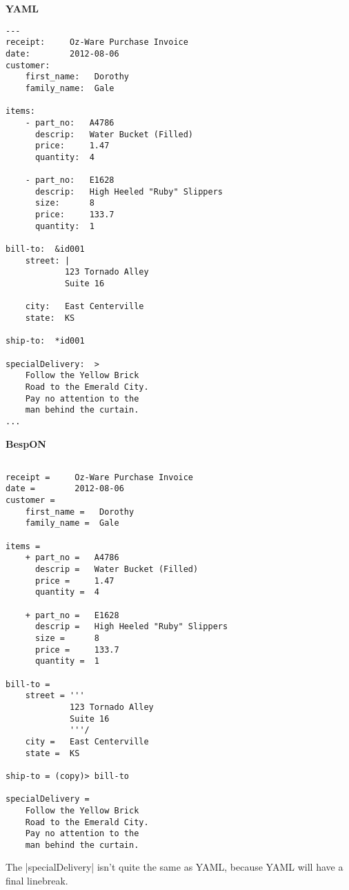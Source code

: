 \documentclass[11pt]{article}
\begin{document}
\begin{appendices}
\begin{tcolorbox}{}
\begin{multicols}{2}
\centering \textbf{YAML}
\begin{Verbatim}[formatcom=\color{DarkGreen}]
---
receipt:     Oz-Ware Purchase Invoice
date:        2012-08-06
customer:
    first_name:   Dorothy
    family_name:  Gale

items:
    - part_no:   A4786
      descrip:   Water Bucket (Filled)
      price:     1.47
      quantity:  4

    - part_no:   E1628
      descrip:   High Heeled "Ruby" Slippers
      size:      8
      price:     133.7
      quantity:  1

bill-to:  &id001
    street: |
            123 Tornado Alley
            Suite 16

    city:   East Centerville
    state:  KS

ship-to:  *id001

specialDelivery:  >
    Follow the Yellow Brick
    Road to the Emerald City.
    Pay no attention to the
    man behind the curtain.
...
\end{Verbatim}
\columnbreak
\centering \textbf{BespON}

\begin{Verbatim}

receipt =     Oz-Ware Purchase Invoice
date =        2012-08-06
customer =
    first_name =   Dorothy
    family_name =  Gale

items =
    + part_no =   A4786
      descrip =   Water Bucket (Filled)
      price =     1.47
      quantity =  4

    + part_no =   E1628
      descrip =   High Heeled "Ruby" Slippers
      size =      8
      price =     133.7
      quantity =  1

bill-to =
    street = '''
             123 Tornado Alley
             Suite 16
             '''/
    city =   East Centerville
    state =  KS

ship-to = (copy)> bill-to

specialDelivery = 
    Follow the Yellow Brick
    Road to the Emerald City.
    Pay no attention to the
    man behind the curtain.

\end{Verbatim}
\end{multicols}
\end{tcolorbox}
The |specialDelivery| isn't quite the same as YAML, because YAML will have a final linebreak.



\begin{tcolorbox}{}
\begin{multicols}{2}


\end{multicols}
\end{tcolorbox}
\end{appendices}
\end{document}
